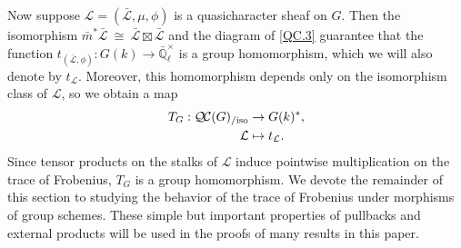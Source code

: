 \documentclass[CM,Submssn,SecEq]{degruyter-crelle} %
\theoremstyle{plain}
\theoremstyle{definition}
\theoremstyle{remark}
\newcommand{\EE}{\mathbb{\bar Q}_\ell}
\newcommand{\Fq}{k}
\newcommand{\EEx}{\EE^\times}
\newcommand{\iso}{{\ \cong\ }}
\newcommand{\trFrob}[1]{t_{#1}}
\newcommand{\TrFrob}[1]{T_{#1}}
\newcommand{\qcs}[1]{{\mathcal{#1}}}
\newcommand{\gqcs}[1]{{\mathcal{\bar #1}}}
\newcommand{\QC}{{\mathcal{Q\hskip-0.8pt C}}}
\newcommand{\QCiso}[1]{\QC(#1)_{/\text{iso}}}
\newcommand{\bm}{\bar{m}}
\begin{document}
Now suppose $\qcs{L} = (\gqcs{L},\mu,\phi)$ is a quasicharacter sheaf on $G$.
Then the isomorphism $\bm^* \gqcs{L} \iso \gqcs{L} \boxtimes\gqcs{L}$ and the diagram of
\ref{QC.3} guarantee
that the function $\trFrob{(\gqcs{L},\phi)} : G(\Fq)\to \EEx$ is a group homomorphism, which we will also denote by $\trFrob{\qcs{L}}$.  Moreover,
this homomorphism depends only on the isomorphism class of $\qcs{L}$, so we obtain a map
\begin{align*}
\TrFrob{G} : \QCiso{G} &\to G(\Fq)^*, \\
\qcs{L} &\mapsto \trFrob{\qcs{L}}.
\end{align*}
Since tensor products on the stalks of $\qcs{L}$ induce pointwise multiplication on the trace of Frobenius, $\TrFrob{G}$ is a group homomorphism.  We devote the remainder of this section to
studying the behavior of the trace of Frobenius under morphisms of group schemes.  These simple but important
properties of pullbacks and external products will be used in the proofs of many results in this paper.
\end{document}
